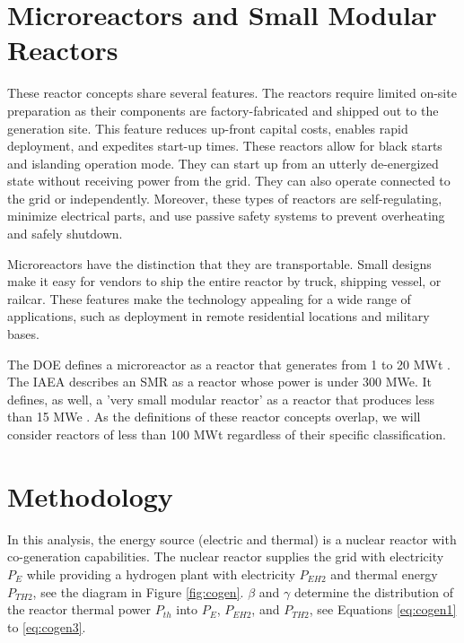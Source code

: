 \section{Microreactors and Small Modular Reactors}
\label{sec:reactors}

These reactor concepts share several features.
The reactors require limited on-site preparation as their components are factory-fabricated and shipped out to the generation site.
This feature reduces up-front capital costs, enables rapid deployment, and expedites start-up times.
These reactors allow for black starts and islanding operation mode.
They can start up from an utterly de-energized state without receiving power from the grid.
They can also operate connected to the grid or independently.
Moreover, these types of reactors are self-regulating, minimize electrical parts, and use passive safety systems to prevent overheating and safely shutdown.

Microreactors have the distinction that they are transportable.
Small designs make it easy for vendors to ship the entire reactor by truck, shipping vessel, or railcar.
These features make the technology appealing for a wide range of applications, such as deployment in remote residential locations and military bases.

The \gls{DOE} defines a microreactor as a reactor that generates from 1 to 20 MWt \cite{us-doe_ultimate_2019}.
The \gls{IAEA} describes an \gls{SMR} as a reactor whose power is under 300 MWe.
It defines, as well, a 'very small modular reactor' as a reactor that produces less than 15 MWe \cite{world_nuclear_association_small_2020}.
As the definitions of these reactor concepts overlap, we will consider reactors of less than 100 MWt regardless of their specific classification.

\section{Methodology}
\label{sec:metho}

In this analysis, the energy source (electric and thermal) is a nuclear reactor with co-generation capabilities.
The nuclear reactor supplies the grid with electricity $P_E$ while providing a hydrogen plant with electricity $P_{EH2}$ and thermal energy $P_{TH2}$, see the diagram in Figure \ref{fig:cogen}.
$\beta$ and $\gamma$ determine the distribution of the reactor thermal power $P_{th}$ into $P_E$, $P_{EH2}$, and $P_{TH2}$, see Equations \ref{eq:cogen1} to \ref{eq:cogen3}.

